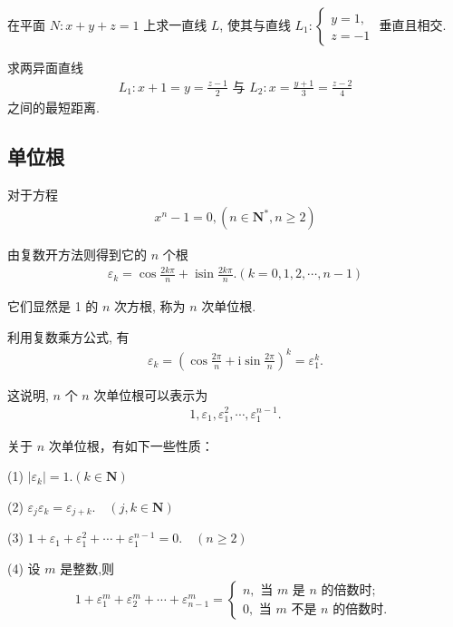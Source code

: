 \begin{exercise}
	在平面 $N: x+y+z=1$ 上求一直线 $L$, 使其与直线 $L_1:\left\{\begin{array}{l}y=1, \\ z=-1\end{array}\right.$ 垂直且相交.
\end{exercise}

\begin{exercise}
	求两异面直线
	\begin{align*}
		L_1: x+1=y=\frac{z-1}{2} \text { 与 } L_2: x=\frac{y+1}{3}=\frac{z-2}{4}
	\end{align*}
	之间的最短距离.
\end{exercise}


\subsection{单位根}
对于方程
\begin{align*}
	x^n-1=0,\left(n \in \mathbf{N}^*, n \geqslant 2\right)
\end{align*}

由复数开方法则得到它的 $n$ 个根
\begin{align*}
	\varepsilon_k=\cos \frac{2 k \pi}{n}+\operatorname{isin} \frac{2 k \pi}{n} .(k=0,1,2, \cdots, n-1)
\end{align*}

它们显然是 1 的 $n$ 次方根, 称为 $n$ 次单位根.

利用复数乘方公式, 有
\begin{align*}
	\varepsilon_k=\left(\cos \frac{2 \pi}{n}+\mathrm{i} \sin \frac{2 \pi}{n}\right)^k=\varepsilon_1^k .
\end{align*}

这说明, $n$ 个 $n$ 次单位根可以表示为
\begin{align*}
	1, \varepsilon_1, \varepsilon_1^2, \cdots, \varepsilon_1^{n-1} .
\end{align*}

关于 $n$ 次单位根，有如下一些性质：

(1) $\left|\varepsilon_k\right|=1 .(k \in \mathbf{N})$

(2) $\varepsilon_j \varepsilon_k=\varepsilon_{j+k} . \quad(j, k \in \mathbf{N})$

(3) $1+\varepsilon_1+\varepsilon_1^2+\cdots+\varepsilon_1^{n-1}=0 . \quad(n \geqslant 2)$

(4) 设 $m$ 是整数,则
\begin{align*}
	1+\varepsilon_1^m+\varepsilon_2^m+\cdots+\varepsilon_{n-1}^m=\left\{\begin{array}{l}
		                                                                    n, \text { 当 } m \text { 是 } n \text { 的倍数时; } \\
		                                                                    0, \text { 当 } m \text { 不是 } n \text { 的倍数时. }
	                                                                    \end{array}\right.
\end{align*}

